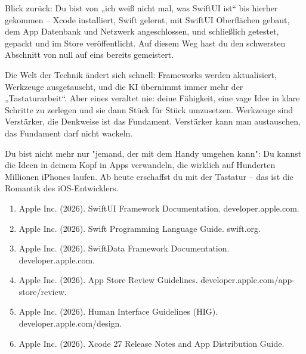 
Blick zurück: Du bist von „ich weiß nicht mal, was SwiftUI ist“ bis hierher gekommen – Xcode installiert, Swift gelernt, mit SwiftUI Oberflächen gebaut, dem App Datenbank und Netzwerk angeschlossen, und schließlich getestet, gepackt und im Store veröffentlicht. Auf diesem Weg hast du den schwersten Abschnitt von null auf eins bereits gemeistert.

Die Welt der Technik ändert sich schnell: Frameworks werden aktualisiert, Werkzeuge ausgetauscht, und die KI übernimmt immer mehr der „Tastaturarbeit“. Aber eines veraltet nie: deine Fähigkeit, eine vage Idee in klare Schritte zu zerlegen und sie dann Stück für Stück umzusetzen. Werkzeuge sind Verstärker, die Denkweise ist das Fundament. Verstärker kann man austauschen, das Fundament darf nicht wackeln.

Du bist nicht mehr nur "jemand, der mit dem Handy umgehen kann": Du kannst die Ideen in deinem Kopf in Apps verwandeln, die wirklich auf Hunderten Millionen iPhones laufen. Ab heute erschaffst du mit der Tastatur – das ist die Romantik des iOS-Entwicklers.


\begin{enumerate}
  \item Apple Inc. (2026). SwiftUI Framework Documentation. developer.apple.com.
  \item Apple Inc. (2026). Swift Programming Language Guide. swift.org.
  \item Apple Inc. (2026). SwiftData Framework Documentation. developer.apple.com.
  \item Apple Inc. (2026). App Store Review Guidelines. developer.apple.com/app-store/review.
  \item Apple Inc. (2026). Human Interface Guidelines (HIG). developer.apple.com/design.
  \item Apple Inc. (2026). Xcode 27 Release Notes and App Distribution Guide.
\end{enumerate}
